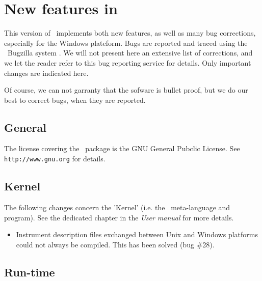 
\chapter{New features in \MCS\ \version\ }
\label{c:changes}

This version of \MCS\ implements both new features, as well as many bug corrections, especially for the Windows plateform. Bugs are reported and traced using the \MCS\ Bugzilla system \cite{mczilla_webpage}. We will not present here an extensive list of corrections, and we let the reader refer to this bug reporting service for details. Only important changes are indicated here.

Of course, we can not garranty that the sofware is bullet proof, but we do our best to correct bugs, when they are reported.

\section{General}
\label{s:new-features:general}
The license covering the \MCS\ package is the GNU General Pubclic License. See \verb+http://www.gnu.org+ for details.

\section{Kernel}
\label{s:new-features:kernel}

The following changes concern the 'Kernel' (i.e. the \MCS\ meta-language and program). See the dedicated chapter in the {\it User manual} for more details.

\begin{itemize}
\item Instrument description files exchanged between Unix and Windows
  platforms could not always be compiled. This has been solved (bug \#28).
\end{itemize}

\section{Run-time}
\label{s:new-features:run-time}

